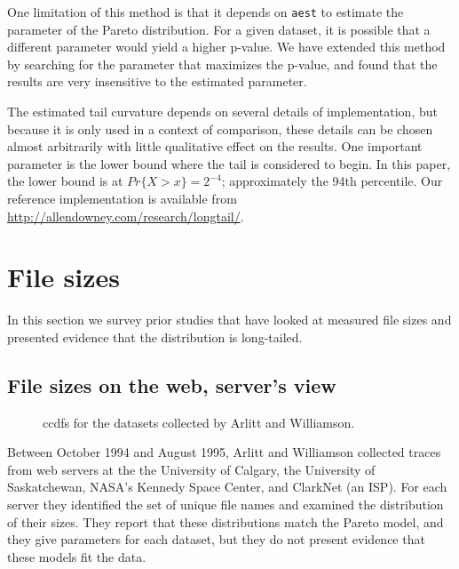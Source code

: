\documentclass{elsart}
\begin{document}
One limitation of this method is that it depends on \texttt{aest}
to estimate the parameter of the Pareto distribution.  For
a given dataset, it is possible that a different parameter would
yield a higher p-value.  We have extended this method by searching
for the parameter that maximizes the p-value, and found that the
results are very insensitive to the estimated parameter.

The estimated tail curvature depends on several details
of implementation, but because it is only used
in a context of comparison, these details can be chosen
almost arbitrarily with little qualitative effect on the results.
One important parameter is the lower bound where the tail is
considered to begin.  In this paper, the lower bound is at
$Pr \{ X>x \} = 2^{-4}$; approximately the 94th percentile.
Our reference implementation is available
from \url{http://allendowney.com/research/longtail/}.


\section{File sizes}
\label{filesizes}

In this section we survey prior studies that have looked at
measured file sizes and presented evidence that
the distribution is long-tailed.  

\subsection {File sizes on the web, server's view}

\begin{figure}[p]
\centerline{}
\vspace{0.2in}
\centerline{}
\vspace{0.2in}
\centerline{}
\vspace{0.2in}
\centerline{}
\caption{ccdfs for the datasets collected by Arlitt and Williamson.}
\label{fig.carey}
\end{figure}

Between October 1994 and August 1995, Arlitt and Williamson
\cite{ArlittWilliamson96} collected traces from web servers at the
the University of Calgary, the University of
Saskatchewan, NASA's Kennedy Space Center, and ClarkNet (an ISP).
For each server they identified the set of unique file names
and examined the distribution of their sizes.  They report that these
distributions match the Pareto model, and they give parameters
for each dataset, but they do not 
present evidence that these models fit the data.
\end{document}
